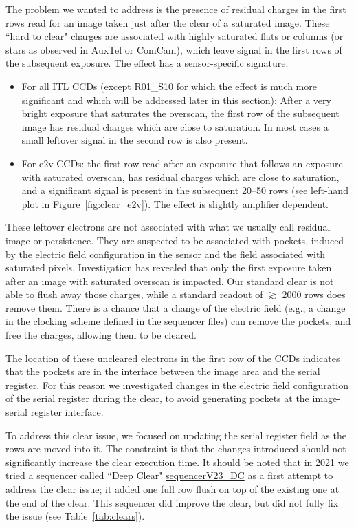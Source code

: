 The problem we wanted to address is the presence of residual charges in
the first rows read for an image taken just after the clear of a saturated
image. These ``hard to clear" charges are associated with highly
saturated flats or columns (or stars as observed in AuxTel or ComCam),
which leave signal in the first rows of the subsequent exposure. The effect has a sensor-specific signature:

\begin{itemize}
\item
  For all ITL CCDs (except R01\_S10 for which the effect is much more significant and which will be addressed later in this section): After a very bright exposure that saturates the overscan, the first row of the subsequent image has residual charges which are close to saturation. In most cases a small leftover signal in the second row is also present.
\item
  For e2v CCDs: the first row read after an exposure that follows an exposure with saturated
  overscan, has residual charges which are close to saturation, and a significant signal is present
  in the subsequent 20--50 rows (see left-hand plot in Figure~\ref{fig:clear_e2v}).
  The effect is slightly amplifier dependent.
\end{itemize}

These leftover electrons are not associated with what we usually call residual image or persistence. They are suspected to be associated with pockets, induced by the electric field configuration in the sensor and the field associated with saturated pixels.
Investigation has revealed that only the first exposure taken after an image with saturated overscan is impacted. Our standard clear is not able to flush away those charges, while a standard readout of $\gtrsim$ 2000 rows does remove them.
There is a chance that a change of the electric field (e.g., a change in the clocking scheme defined in the sequencer files) can remove the pockets, and free the charges, allowing them to be cleared.

The location of these uncleared electrons in the first row of the
CCDs indicates that the pockets are in the interface between the image area and the serial register. For this reason we investigated
changes in the electric field configuration of the serial register during the
clear, to avoid generating pockets at the image-serial register interface.


To address this clear issue, we focused on updating the serial
register field as the rows are moved into it. The constraint is that
the changes introduced should not significantly increase the clear
execution time. It should be noted that in 2021 we tried a sequencer
called ``Deep Clear" \href{https://github.com/lsst-camera-dh/sequencer-files/blob/master/run5/FP_E2V_2s_ir2_v23_DC.seq}{sequencerV23\_DC} as a first attempt to address the clear issue; it added one full row 
flush on top of the existing one at the end of the clear. This sequencer
did improve the clear, but did  not fully fix the issue (see
Table~\ref{tab:clears}).

